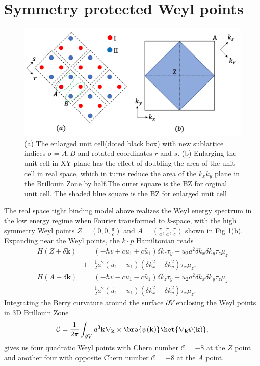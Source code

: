 \section{Symmetry protected Weyl points}
\begin{figure}[h]
    \centering\includegraphics[width=\textwidth]{enlarged.png}
    \caption{(a) The enlarged unit cell(doted black box) with new sublattice indices $\sigma = A, B$ and rotated coordinates $r$ and $s$. (b) Enlarging the unit cell in XY plane has the effect of doubling the area of the unit cell in real space, which in turns reduce the area of the $k_x k_y$ plane in the Brillouin Zone by half.The outer square is the BZ for orginal unit cell. The shaded blue square is the BZ for enlarged unit cell}\label{fig:enlarged}
\end{figure}
The real space tight binding model above realizes the Weyl energy spectrum in the low energy regime when Fourier transformed to $k$-space, with the high symmetry Weyl points $Z = (0, 0, \frac{\pi}{c})$ and $A = (\frac{\pi}{a}, \frac{\pi}{a}, \frac{\pi}{c})$ shown in Fig \ref{fig:enlarged}(b). Expanding near the Weyl points, the $k \cdot p$ Hamiltonian reads
\begin{eqnarray}
    H ( Z + \delta \mathbf{k}) &=& (-\hbar v + c u_1 + c \tilde{u_1} ) \delta k_z \tau_y + u_2 a^2 \delta k_x \delta k_y \tau_z \mu_z \nonumber \\ &+& \frac{1}{2} a^2 (\tilde{u_1} - u_1) (\delta k_x^2 - \delta k_y^2) \tau_x \mu_z , \\  
    H (A + \delta \mathbf{k}) &=& (-\hbar v - c u_1 -c \tilde{u_1}) \delta k_z \tau_y + u_2 a^2 \delta k_x \delta k_y \tau_z \mu_z \nonumber \\ &-& \frac{1}{2} a^2 (\tilde{u_1} - u_1)(\delta k_x^2 - \delta k_y^2) \tau_x \mu_z .
\end{eqnarray}
Integrating the Berry curvature around the surface $\partial V$ enclosing the Weyl points in 3D Brillouin Zone
\begin{equation}
\mathcal{C} = \frac{1}{2\pi}\int_{\partial V} d^3 \mathbf{k} \nabla_{\mathbf{k}} \times \bra{\psi (\mathbf{k})}  \ket{\nabla_{\mathbf{k}} \psi (\mathbf{k})} ,
\end{equation}
 gives us four quadratic Weyl points with Chern number $\mathcal{C} =-8$ at the $Z$ point and another four with opposite Chern number $\mathcal{C} =+8$ at the $A$ point.

